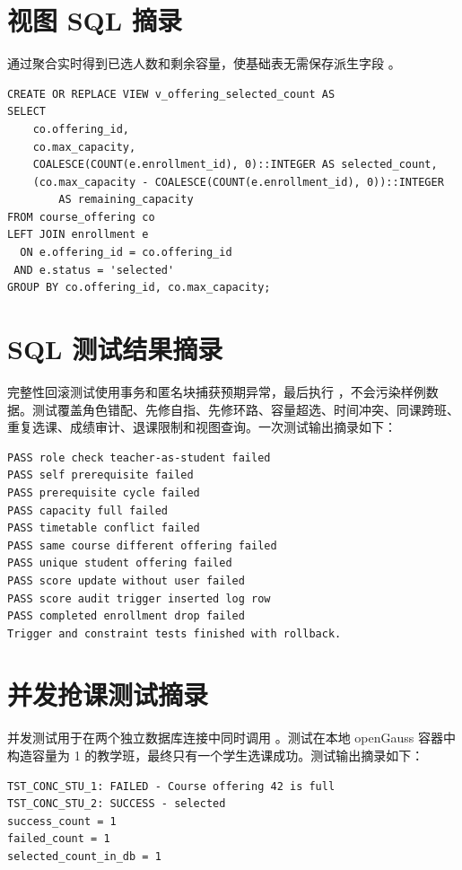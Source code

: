 \section{视图 SQL 摘录}

 通过聚合实时得到已选人数和剩余容量，使基础表无需保存派生字段 。

\begin{lstlisting}[style=sqlstyle]
CREATE OR REPLACE VIEW v_offering_selected_count AS
SELECT
    co.offering_id,
    co.max_capacity,
    COALESCE(COUNT(e.enrollment_id), 0)::INTEGER AS selected_count,
    (co.max_capacity - COALESCE(COUNT(e.enrollment_id), 0))::INTEGER
        AS remaining_capacity
FROM course_offering co
LEFT JOIN enrollment e
  ON e.offering_id = co.offering_id
 AND e.status = 'selected'
GROUP BY co.offering_id, co.max_capacity;
\end{lstlisting}

\section{SQL 测试结果摘录}

完整性回滚测试使用事务和匿名块捕获预期异常，最后执行 ，不会污染样例数据。测试覆盖角色错配、先修自指、先修环路、容量超选、时间冲突、同课跨班、重复选课、成绩审计、退课限制和视图查询。一次测试输出摘录如下：

\begin{lstlisting}[style=codestyle]
PASS role check teacher-as-student failed
PASS self prerequisite failed
PASS prerequisite cycle failed
PASS capacity full failed
PASS timetable conflict failed
PASS same course different offering failed
PASS unique student offering failed
PASS score update without user failed
PASS score audit trigger inserted log row
PASS completed enrollment drop failed
Trigger and constraint tests finished with rollback.
\end{lstlisting}

\section{并发抢课测试摘录}

并发测试用于在两个独立数据库连接中同时调用 。测试在本地 openGauss 容器中构造容量为 1 的教学班，最终只有一个学生选课成功。测试输出摘录如下：

\begin{lstlisting}[style=codestyle]
TST_CONC_STU_1: FAILED - Course offering 42 is full
TST_CONC_STU_2: SUCCESS - selected
success_count = 1
failed_count = 1
selected_count_in_db = 1
\end{lstlisting}

